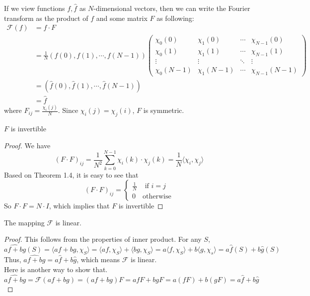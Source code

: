 If we view functions $f, \widehat{f}$ as $N$-dimensional vectors, then we can write the Fourier transform as the product of $f$ and some matrix $F$ as following: \\
\begin{align*}
\mathcal{F}(f) 
& = f \cdot F \\
& = \frac{1}{N} \left( f(0), f(1), \cdots , f(N-1) \right)
	 \left( \begin{array}{cccc}
		\chi_0(0)  &  \chi_1(0)   & \cdots  & \chi_{N-1}(0) \\
		\chi_0(1)  &  \chi_1(1)   & \cdots  & \chi_{N-1}(1) \\
		\vdots     & \vdots       & \ddots  & \vdots       \\
	    \chi_0(N-1)& \chi_1(N-1)  & \cdots  & \chi_{N-1}(N-1)	
\end{array} \right) \\ 
&= (\widehat{f}(0), \widehat{f}(1), \cdots, \widehat{f}(N-1)) \\
& = \widehat{f}
\end{align*}
where $F_{ij} = \frac{\chi_i(j)}{N}$. Since $\chi_i(j) = \chi_j(i)$, $F$ is symmetric. 

\begin{lemma}
$F$ is invertible
\end{lemma}

\begin{proof}
We have 
$$(F \cdot F)_{ij} = \frac{1}{N^2}\sum\limits_{k=0}^{N-1} 
 \chi_i(k) \cdot \chi_j(k) = \frac{1}{N} \langle \chi_i, \chi_j \rangle $$ 
Based on Theorem 1.4, it is easy to see that $$(F \cdot F)_{ij} = 
\begin{cases}
	 \frac{1}{N} & \text{ if } i = j \\
	 0             & \text{otherwise} \end{cases} $$
So $F \cdot F = N \cdot I$, which implies that $F$ is invertible
\end{proof}

\begin{theorem}
The mapping $\mathcal{F}$ is linear.
\end{theorem}

\begin{proof}
This follows from the properties of inner product. For any $S$,
$$\widehat{af+bg}(S) =
 \langle af + bg, \chi_S \rangle = 
 \langle af, \chi_S \rangle + \langle bg, \chi_S \rangle = 
 a\langle f, \chi_S \rangle + b \langle g, \chi_s \rangle =
 a \widehat{f}(S) + b \widehat{g}(S) $$
Thus, $\widehat{af+bg} =   a \widehat{f} + b \widehat{g}$, which means $
\mathcal{F}$ is linear. \\
Here is another way to show that.
 $$\widehat{af+bg} = \mathcal{F}(af + bg) = (af+ bg) F = 
 af F + bg  F = a(f F) + b (g F) = a\widehat{f} + b \widehat{g} $$
\end{proof}

